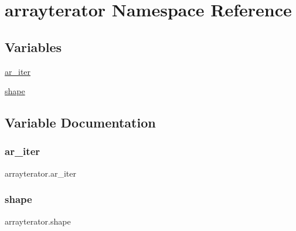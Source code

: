 \hypertarget{namespacearrayterator}{}\section{arrayterator Namespace Reference}
\label{namespacearrayterator}
\subsection*{Variables}
\begin{DoxyCompactItemize}
\item 
\hyperlink{namespacearrayterator_ab2001192f52ce6597a6c816c4cd1d74d}{ar\+\_\+iter}
\item 
\hyperlink{namespacearrayterator_a5a7d2d8a2a22a39b33680ed8cd30c716}{shape}
\end{DoxyCompactItemize}


\subsection{Variable Documentation}
\mbox{\label{namespacearrayterator_ab2001192f52ce6597a6c816c4cd1d74d}} 
\subsubsection{\texorpdfstring{ar\+\_\+iter}{ar\_iter}}
{\footnotesize\ttfamily arrayterator.\+ar\+\_\+iter}

\mbox{\label{namespacearrayterator_a5a7d2d8a2a22a39b33680ed8cd30c716}} 
\subsubsection{\texorpdfstring{shape}{shape}}
{\footnotesize\ttfamily arrayterator.\+shape}

